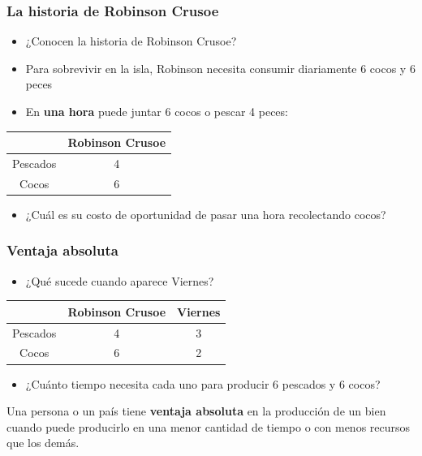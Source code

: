 \documentclass{beamer}
\begin{document}
\begin{frame}
\frametitle{La historia de Robinson Crusoe}
    \begin{itemize}
    \item ¿Conocen la historia de Robinson Crusoe?
    \item Para sobrevivir en la isla, Robinson necesita consumir diariamente 6 cocos y 6 peces
    \item En \textbf{una hora} puede juntar 6 cocos o pescar 4 peces:
    \end{itemize}
    
    \centering \vspace{4mm}
    \renewcommand{\arraystretch}{1.2}
    \begin{tabular}{|c|c|} \hline
    \rowcolor{blue!20} 
    & \textbf{Robinson Crusoe} \\ \hline
    Pescados   & 4  \\ \hline
    Cocos   & 6  \\ \hline     
    \end{tabular}
    
    \begin{itemize}\vspace{4mm}
    \item ¿Cuál es su costo de oportunidad de pasar una hora recolectando cocos? 
    \end{itemize}
\end{frame}

\begin{frame}
\frametitle{Ventaja absoluta}
    \begin{itemize}
    \item ¿Qué sucede cuando aparece Viernes?  
    \end{itemize}
    
    \centering \vspace{4mm}
    \renewcommand{\arraystretch}{1.2}
    \begin{tabular}{|c|c|c|} \hline
    \rowcolor{blue!20} 
    & \textbf{Robinson Crusoe} & \textbf{Viernes} \\ \hline
    Pescados   & 4 & 3 \\ \hline
    Cocos   & 6 & 2 \\ \hline     
    \end{tabular}
    
    \begin{itemize}\vspace{4mm}
    \item ¿Cuánto tiempo necesita cada uno para producir 6 pescados y 6 cocos?
    \end{itemize}

    \begin{boxB}
    \centering
    Una persona o un país tiene \textbf{ventaja absoluta} en la producción de un bien cuando puede producirlo en una menor cantidad de tiempo o con menos recursos que los demás.
    \end{boxB}
\end{frame}
\end{document}
